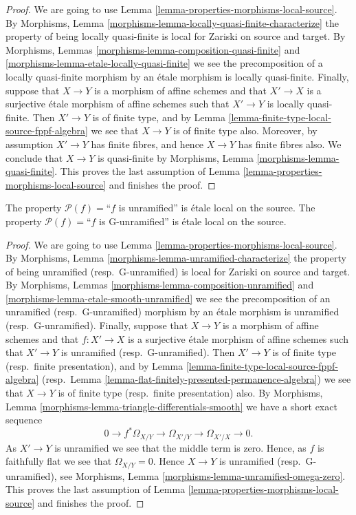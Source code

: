 \begin{proof}
We are going to use
Lemma \ref{lemma-properties-morphisms-local-source}.
By
Morphisms, Lemma
\ref{morphisms-lemma-locally-quasi-finite-characterize}
the property of being locally quasi-finite is local for Zariski on source
and target. By
Morphisms, Lemmas
\ref{morphisms-lemma-composition-quasi-finite} and
\ref{morphisms-lemma-etale-locally-quasi-finite}
we see the precomposition
of a locally quasi-finite morphism by an \'etale morphism is locally
quasi-finite. Finally, suppose that $X \to Y$ is a morphism of affine schemes
and that $X' \to X$ is a surjective \'etale morphism of affine schemes
such that $X' \to Y$ is locally quasi-finite. Then $X' \to Y$ is of finite
type, and by
Lemma \ref{lemma-finite-type-local-source-fppf-algebra}
we see that $X \to Y$ is of finite type also.
Moreover, by assumption $X' \to Y$ has finite fibres, and hence $X \to Y$
has finite fibres also. We conclude that $X \to Y$ is quasi-finite by
Morphisms, Lemma \ref{morphisms-lemma-quasi-finite}.
This proves the last assumption of
Lemma \ref{lemma-properties-morphisms-local-source}
and finishes the proof.
\end{proof}

\begin{lemma}
\label{lemma-unramified-etale-local-source}
The property $\mathcal{P}(f)=$``$f$ is unramified''
is \'etale local on the source.
The property $\mathcal{P}(f)=$``$f$ is G-unramified''
is \'etale local on the source.
\end{lemma}

\begin{proof}
We are going to use
Lemma \ref{lemma-properties-morphisms-local-source}.
By
Morphisms, Lemma \ref{morphisms-lemma-unramified-characterize}
the property of being unramified (resp.\ G-unramified)
is local for Zariski on source and target. By
Morphisms, Lemmas \ref{morphisms-lemma-composition-unramified} and
\ref{morphisms-lemma-etale-smooth-unramified}
we see the precomposition
of an unramified (resp.\ G-unramified) morphism by an \'etale morphism is
unramified (resp.\ G-unramified).
Finally, suppose that $X \to Y$ is a morphism of affine schemes
and that $f : X' \to X$ is a surjective \'etale morphism of affine schemes
such that $X' \to Y$ is unramified (resp.\ G-unramified).
Then $X' \to Y$ is of finite type (resp.\ finite presentation), and by
Lemma \ref{lemma-finite-type-local-source-fppf-algebra}
(resp.\ Lemma \ref{lemma-flat-finitely-presented-permanence-algebra})
we see that $X \to Y$ is of finite type (resp.\ finite presentation) also. By
Morphisms, Lemma \ref{morphisms-lemma-triangle-differentials-smooth}
we have a short exact sequence
$$
0 \to f^*\Omega_{X/Y} \to \Omega_{X'/Y} \to \Omega_{X'/X} \to 0.
$$
As $X' \to Y$ is unramified we see that the middle term is zero.
Hence, as $f$ is faithfully flat we see that $\Omega_{X/Y} = 0$.
Hence $X \to Y$ is unramified (resp.\ G-unramified), see
Morphisms, Lemma \ref{morphisms-lemma-unramified-omega-zero}.
This proves the last assumption of
Lemma \ref{lemma-properties-morphisms-local-source}
and finishes the proof.
\end{proof}





